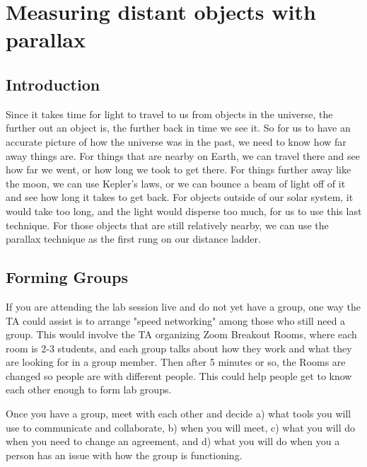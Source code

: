 \chapter{Measuring distant objects with parallax}




\section{Introduction}

Since it takes time for light to travel to us from objects in the universe, the further out an object is, the further back in time we see it. So for us to have an accurate picture of how the universe was in the past, we need to know how far away things are. For things that are nearby on Earth, we can travel there and see how far we went, or how long we took to get there. For things further away like the moon, we can use Kepler's laws, or we can bounce a beam of light off of it and see how long it takes to get back. For objects outside of our solar system, it would take too long, and the light would disperse too much, for us to use this last technique. For those objects that are still relatively nearby, we can use the parallax technique as the first rung on our distance ladder.

\section{Forming Groups}

If you are attending the lab session live and do not yet have a group, one way the TA could assist is to arrange "speed networking" among those who still need a group. This would involve the TA organizing Zoom Breakout Rooms, where each room is 2-3 students, and each group talks about how they work and what they are looking for in a group member. Then after 5 minutes or so, the Rooms are changed so people are with different people. This could help people get to know each other enough to form lab groups.

\begin{steps}
	\item Once you have a group, meet with each other and decide a) what tools you will use to communicate and collaborate, b) when you will meet, c) what you will do when you need to change an agreement, and d) what you will do when you a person has an issue with how the group is functioning.
\end{steps}

